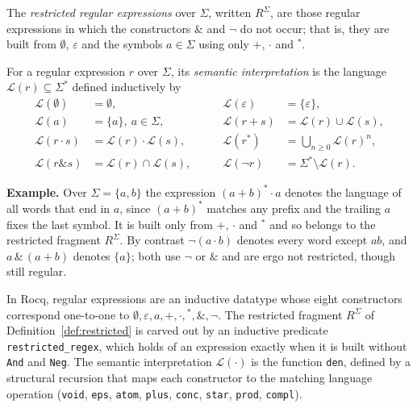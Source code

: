 \begin{definition}\label{def:restricted}
The \emph{restricted regular expressions} over $\Sigma$, written $R^{\Sigma}$, are
those regular expressions in which the constructors $\&$ and $\neg$ do not occur;
that is, they are built from $\emptyset$, $\varepsilon$ and the symbols $a\in\Sigma$
using only $+$, $\cdot$ and ${}^{*}$.
\end{definition}

\begin{definition}
For a regular expression $r$ over $\Sigma$, its \emph{semantic interpretation} is
the language $\mathcal{L}(r) \subseteq \Sigma^*$ defined inductively by
\[
\begin{aligned}
\mathcal{L}(\emptyset)   &= \emptyset, &\qquad
\mathcal{L}(\varepsilon) &= \{\varepsilon\}, \\
\mathcal{L}(a)           &= \{a\},\ a \in \Sigma, &\qquad
\mathcal{L}(r + s)       &= \mathcal{L}(r) \cup \mathcal{L}(s), \\
\mathcal{L}(r \cdot s)   &= \mathcal{L}(r)\cdot\mathcal{L}(s), &\qquad
\mathcal{L}(r^*)         &= \textstyle\bigcup_{n \geq 0} \mathcal{L}(r)^n, \\
\mathcal{L}(r \& s)      &= \mathcal{L}(r) \cap \mathcal{L}(s), &\qquad
\mathcal{L}(\neg r)      &= \Sigma^* \setminus \mathcal{L}(r).
\end{aligned}
\]
\end{definition}

\noindent\textbf{Example.} Over $\Sigma=\{a,b\}$ the expression $(a+b)^{*}\cdot a$
denotes the language of all words that end in $a$, since $(a+b)^{*}$ matches any
prefix and the trailing $a$ fixes the last symbol. It is built only from $+$,
$\cdot$ and ${}^{*}$ and so belongs to the restricted fragment $R^{\Sigma}$. By
contrast $\neg(a\cdot b)$ denotes every word except $ab$, and $a\,\&\,(a+b)$ denotes
$\{a\}$; both use $\neg$ or $\&$ and are ergo not restricted, though still regular.

In Rocq, regular expressions are an inductive datatype whose eight constructors
correspond one-to-one to $\emptyset,\varepsilon,a,+,\cdot,{}^{*},\&,\neg$. The
restricted fragment $R^{\Sigma}$ of Definition~\ref{def:restricted} is carved out
by an inductive predicate \texttt{restricted\_regex}, which holds of an expression
exactly when it is built without \texttt{And} and \texttt{Neg}. The semantic
interpretation $\mathcal{L}(\cdot)$ is the function \texttt{den}, defined by a
structural recursion that maps each constructor to the matching language operation
(\texttt{void}, \texttt{eps}, \texttt{atom}, \texttt{plus}, \texttt{conc},
\texttt{star}, \texttt{prod}, \texttt{compl}).

